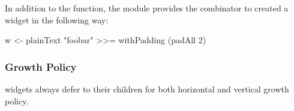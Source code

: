 In addition to the  function, the  module
provides the  combinator to created a 
widget in the following way:

\begin{haskellcode}
 w <- plainText "foobar" >>= withPadding (padAll 2)
\end{haskellcode}

\subsubsection{Growth Policy}

 widgets always defer to their children for both horizontal
and vertical growth policy.

